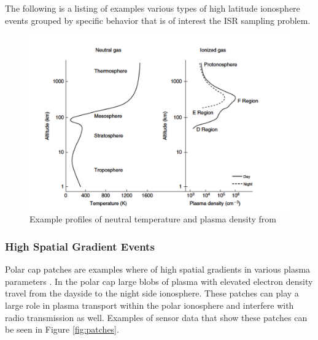 The following is a listing of examples various types of high latitude ionosphere events grouped by specific behavior that is of interest the ISR sampling problem.

\begin{figure}[!t]
\centering
\includegraphics[width=5in]{altvsparams}
\caption{Example profiles of neutral temperature and plasma density from \cite{kellybook}}
\label{fig:singlefilt}
\end{figure}

\subsubsection{High Spatial Gradient Events}
Polar cap patches are examples where of high spatial gradients in various plasma parameters \cite{Dahlgren:2012dq,dahlgren2012di}.  In the polar cap large blobs of plasma with elevated electron density travel from the dayside to the night side ionosphere.  These patches can play a large role in plasma transport within the polar ionosphere and interfere with radio transmission as well.  Examples of sensor data that show these patches can be seen in Figure \ref{fig:patches}.

